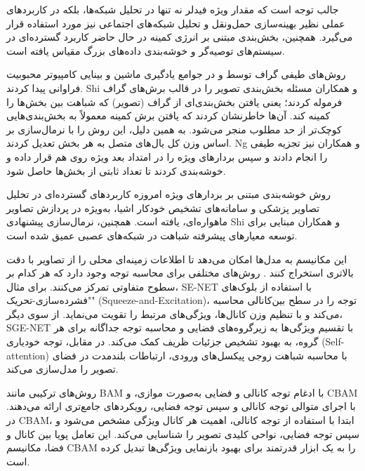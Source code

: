 جالب توجه است که مقدار ویژه فیدلر نه تنها در تحلیل شبکه‌ها، بلکه در کاربردهای عملی نظیر بهینه‌سازی حمل‌ونقل و تحلیل شبکه‌های اجتماعی نیز مورد استفاده قرار می‌گیرد. همچنین، بخش‌بندی مبتنی بر انرژی کمینه در حال حاضر کاربرد گسترده‌ای در سیستم‌های توصیه‌گر و خوشه‌بندی داده‌های بزرگ مقیاس یافته است.

روش‌های طیفی گراف توسط \cite{NIPS2001_801272ee} و \cite{868688} در جوامع یادگیری ماشین و بینایی کامپیوتر محبوبیت فراوانی پیدا کردند. Shi و همکاران \cite{868688} مسئله بخش‌بندی تصویر را در قالب برش‌های گراف فرموله کردند؛ یعنی یافتن بخش‌بندی‌ای از گراف (تصویر) که شباهت بین بخش‌ها را کمینه کند. آن‌ها خاطرنشان کردند که یافتن برش کمینه معمولاً به بخش‌بندی‌هایی کوچک‌تر از حد مطلوب منجر می‌شود. به همین دلیل، این روش را با نرمال‌سازی بر اساس وزن کل یال‌های متصل به هر بخش تعدیل کردند. Ng و همکاران \cite{NIPS2001_801272ee} نیز تجزیه طیفی را انجام دادند و سپس بردارهای ویژه را در امتداد بعد ویژه روی هم قرار داده و خوشه‌بندی کردند تا تعداد ثابتی از بخش‌ها حاصل شود.


روش خوشه‌بندی مبتنی بر بردارهای ویژه امروزه کاربردهای گسترده‌ای در تحلیل تصاویر پزشکی و سامانه‌های تشخیص خودکار اشیا، به‌ویژه در پردازش تصاویر ماهواره‌ای، یافته است. همچنین، نرمال‌سازی پیشنهادی Shi و همکاران مبنایی برای توسعه معیارهای پیشرفته شباهت در شبکه‌های عصبی عمیق شده است.



این مکانیسم به مدل‌ها امکان می‌دهد تا اطلاعات زمینه‌ای محلی را از تصاویر با دقت بالاتری استخراج کنند \cite{vaswani2023attentionneed}. روش‌های مختلفی برای محاسبه توجه وجود دارد که هر کدام بر سطوح متفاوتی تمرکز می‌کنند. برای مثال، SE-NET \cite{8578843} با استفاده از بلوک‌های "فشرده‌سازی-تحریک" (Squeeze-and-Excitation)، توجه را در سطح بین‌کانالی محاسبه می‌کند و با تنظیم وزن کانال‌ها، ویژگی‌های مرتبط را تقویت می‌نماید. از سوی دیگر، SGE-NET \cite{li2019spatialgroupwiseenhanceimproving} با تقسیم ویژگی‌ها به زیرگروه‌های فضایی و محاسبه توجه جداگانه برای هر گروه، به بهبود تشخیص جزئیات ظریف کمک می‌کند. در مقابل، توجه خودیاری (Self-attention) \cite{Self_Attention} با محاسبه شباهت زوجی پیکسل‌های ورودی، ارتباطات بلندمدت در فضای تصویر را مدل‌سازی می‌کند.

روش‌های ترکیبی مانند BAM \cite{park2018bambottleneckattentionmodule} با ادغام توجه کانالی و فضایی به‌صورت موازی، و CBAM \cite{woo2018cbamconvolutionalblockattention} با اجرای متوالی توجه کانالی و سپس توجه فضایی، رویکردهای جامع‌تری ارائه می‌دهند. در CBAM، ابتدا با استفاده از توجه کانالی، اهمیت هر کانال ویژگی مشخص می‌شود و سپس توجه فضایی، نواحی کلیدی تصویر را شناسایی می‌کند. این تعامل پویا بین کانال و فضا، مکانیسم CBAM را به یک ابزار قدرتمند برای بهبود بازنمایی ویژگی‌ها تبدیل کرده است.

